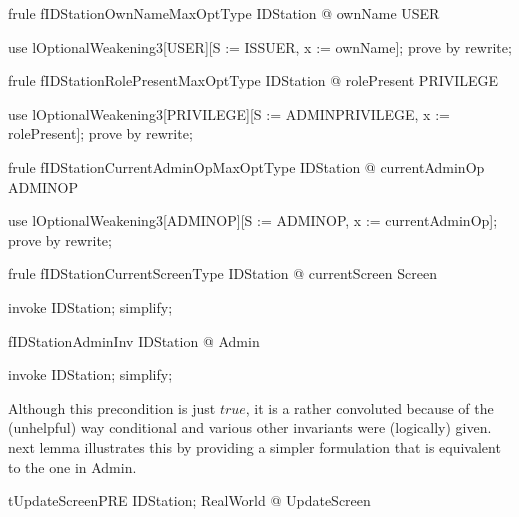 \begin{theorem}{frule fIDStationOwnNameMaxOptType}
   \forall IDStation @ ownName \in \Optional USER
\end{theorem}

\begin{zproof}[fIDStationOwnNameMaxOptType]
use lOptionalWeakening3[USER][S := ISSUER, x := ownName];
prove by rewrite;
\end{zproof}

\begin{theorem}{frule fIDStationRolePresentMaxOptType}
   \forall IDStation @ rolePresent \in \Optional PRIVILEGE
\end{theorem}

\begin{zproof}[fIDStationRolePresentMaxOptType]
use lOptionalWeakening3[PRIVILEGE][S := ADMINPRIVILEGE, x := rolePresent];
prove by rewrite;
\end{zproof}

\begin{theorem}{frule fIDStationCurrentAdminOpMaxOptType}
   \forall IDStation @ currentAdminOp \in \Optional ADMINOP
\end{theorem}

\begin{zproof}[fIDStationCurrentAdminOpMaxOptType]
use lOptionalWeakening3[ADMINOP][S := ADMINOP, x := currentAdminOp];
prove by rewrite;
\end{zproof}

\begin{theorem}{frule fIDStationCurrentScreenType}
   \forall IDStation @ currentScreen \in Screen
\end{theorem}

\begin{zproof}[fIDStationCurrentScreenType]
invoke IDStation;
simplify;
\end{zproof}

\begin{theorem}{fIDStationAdminInv}
   \forall IDStation @ Admin
\end{theorem}

\begin{zproof}[fIDStationAdminInv]
invoke IDStation;
simplify;
\end{zproof}

Although this precondition is just $true$, it is a rather convoluted because of
the (unhelpful) way conditional and various other invariants were (logically) given.
\The next lemma illustrates this by providing a simpler formulation that is equivalent
to the one in Admin.
\begin{theorem}{tUpdateScreenPRE}
    \forall IDStation; RealWorld @ \pre UpdateScreen
\end{theorem}

